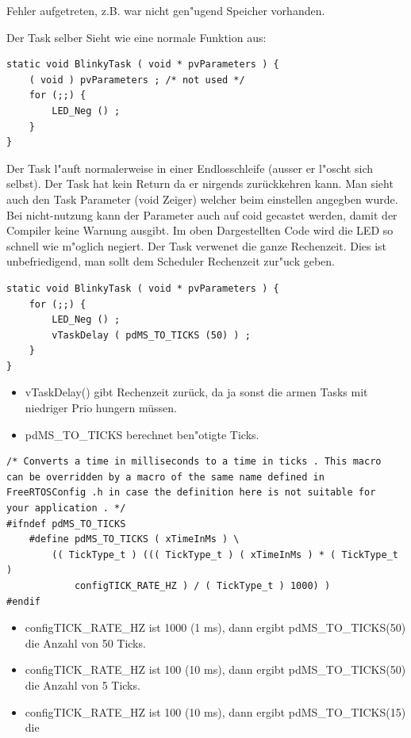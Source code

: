 \documentclass[a4paper, 8pt]{extarticle}
\begin{document}
\begin{multicols*}{3}
\begin{description}
\begin{itemize}
								Fehler aufgetreten, z.B. war nicht gen"ugend Speicher vorhanden.
							\end{itemize}
							Der Task selber Sieht wie eine normale Funktion aus:
						\begin{lstlisting}
static void BlinkyTask ( void * pvParameters ) {
	( void ) pvParameters ; /* not used */
	for (;;) {
		LED_Neg () ;
	}
}
						\end{lstlisting}  
						Der Task l"auft normalerweise in einer Endlosschleife (ausser er l"oscht sich selbst). Der Task hat kein Return da er nirgends zurückkehren kann.
						Man sieht auch den Task Parameter (void Zeiger) welcher beim einstellen angegben wurde. Bei nicht-nutzung kann der Parameter auch auf coid gecastet werden, 
						damit der Compiler keine Warnung ausgibt.
						Im oben Dargestellten Code wird die LED so schnell wie m"oglich negiert. Der Task verwenet die ganze Rechenzeit. Dies ist unbefriedigend, man sollt dem
						Scheduler Rechenzeit zur"uck geben.
						\begin{lstlisting}
static void BlinkyTask ( void * pvParameters ) {
	for (;;) {
		LED_Neg () ;
		vTaskDelay ( pdMS_TO_TICKS (50) ) ;
	}
}
						\end{lstlisting}  
						\begin{itemize}
							\item vTaskDelay() gibt Rechenzeit zurück, da ja sonst die armen Tasks mit niedriger Prio hungern müssen.
							\item pdMS\_TO\_TICKS berechnet ben"otigte Ticks.
						\end{itemize}
						\begin{lstlisting}
/* Converts a time in milliseconds to a time in ticks . This macro
can be overridden by a macro of the same name defined in
FreeRTOSConfig .h in case the definition here is not suitable for
your application . */
#ifndef pdMS_TO_TICKS
	#define pdMS_TO_TICKS ( xTimeInMs ) \
		(( TickType_t ) ((( TickType_t ) ( xTimeInMs ) * ( TickType_t )
			configTICK_RATE_HZ ) / ( TickType_t ) 1000) )
#endif
						\end{lstlisting}  
						\begin{itemize}
							\item configTICK\_RATE\_HZ ist 1000 (1 ms), dann ergibt pdMS\_TO\_TICKS(50) die
							Anzahl von 50 Ticks.						
							\item configTICK\_RATE\_HZ ist 100 (10 ms), dann ergibt pdMS\_TO\_TICKS(50) die
							Anzahl von 5 Ticks.
							\item configTICK\_RATE\_HZ ist 100 (10 ms), dann ergibt pdMS\_TO\_TICKS(15) die

\end{itemize}
\end{description}
\end{multicols*}
\end{document}
